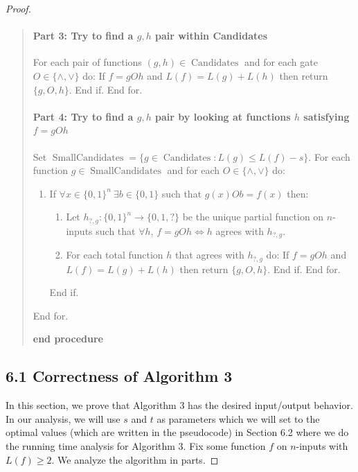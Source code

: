 \documentclass[10pt,a4paper]{article}
\newcommand{\Candidates}{\operatorname{Candidates}}
\begin{document}
\begin{proof}
\begin{quote}
\paragraph{Part 3: Try to find a $g,h$ pair within Candidates}
For each pair of functions $(g,h)\in\Candidates$ and for each gate $O\in\{\land,\lor\}$ do: If $f=gOh$ and $L(f)=L(g)+L(h)$ then return $\{g,O,h\}$. End if. End for.
\paragraph{Part 4: Try to find a $g,h$ pair by looking at functions $h$ satisfying $f=gOh$}
Set $\operatorname{SmallCandidates}=\{g\in\Candidates:L(g)\leq L(f)-s\}$. For each function $g\in\operatorname{SmallCandidates}$ and for each $O\in\{\land,\lor\}$ do:
\begin{enumerate}
\item If $\forall x\in\{0,1\}^n\ \exists b\in\{0,1\}$ such that $g(x)Ob=f(x)$ then:
\begin{enumerate}
\item Let $h_{?,g}:\{0,1\}^n\to\{0,1,?\}$ be the unique partial function on $n$-inputs such that $\forall h$, $f=gOh\Longleftrightarrow h$ agrees with $h_{?,g}$.
\item For each total function $h$ that agrees with $h_{?,g}$ do: If $f=gOh$ and $L(f)=L(g)+L(h)$ then return $\{g,O,h\}$. End if. End for.
\end{enumerate}
End if.
\end{enumerate}
End for.\par
\textbf{end procedure}
\end{quote}
\subsection*{6.1 Correctness of Algorithm 3}
In this section, we prove that Algorithm 3 has the desired input/output behavior. In our analysis, we will use $s$ and $t$ as parameters which we will set to the optimal values (which are written in the pseudocode) in Section 6.2 where we do the running time analysis for Algorithm 3.
Fix some function $f$ on $n$-inputs with $L(f)\geq 2$. We analyze the algorithm in parts.

\end{proof}
\end{document}
